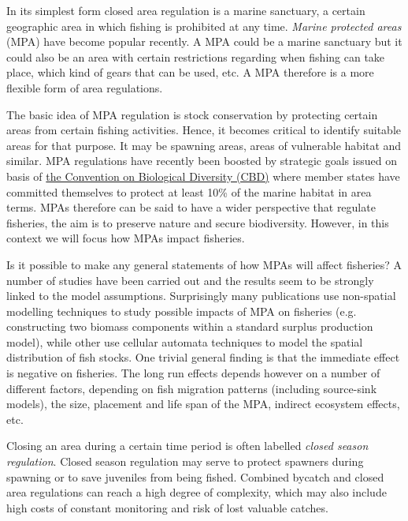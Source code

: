 \documentclass[11pt,fleqn]{book} %
\begin{document}
In its simplest form closed area regulation is a marine sanctuary, a certain geographic area in which fishing is prohibited at any time. \textit{Marine protected areas} (MPA) have become popular recently. A MPA could be a marine sanctuary but it could also be an area with certain restrictions regarding when fishing can take place, which kind of gears that can be used, etc. A MPA therefore is a more flexible form of area regulations.

The basic idea of MPA regulation is stock conservation by protecting certain areas from certain fishing activities. Hence, it becomes critical to identify suitable areas for that purpose. It may be spawning areas, areas of vulnerable habitat and similar. MPA regulations have recently been boosted by strategic goals issued on basis of \href{https://www.cbd.int/}{the Convention on Biological Diversity (CBD)} where member states have committed themselves to protect at least 10\% of the marine habitat in area terms. MPAs therefore can be said to have a wider perspective that regulate fisheries, the aim is to preserve nature and secure biodiversity. However, in this context we will focus how MPAs impact fisheries.

Is it possible to make any general statements of how MPAs will affect fisheries? A number of studies have been carried out and the results seem to be strongly linked to the model assumptions. Surprisingly many publications use non-spatial modelling techniques to study possible impacts of MPA on fisheries (e.g. constructing two biomass components within a standard surplus production model), while other use cellular automata techniques to model the spatial distribution of fish stocks\cite{Silvert2011, Moustakas2011, Seijo2008, Eide2012}. One trivial general finding is that the immediate effect is negative on fisheries. The long run effects depends however on a number of different factors, depending on fish migration patterns (including source-sink models), the size, placement and life span of the MPA, indirect ecosystem effects, etc.

Closing an area during a certain time period is often labelled \textit{closed season regulation}. Closed season regulation may serve to protect spawners during spawning or to save juveniles from being fished. Combined bycatch and closed area regulations can reach a high degree of complexity, which may also include high costs of constant monitoring and risk of lost valuable catches. 
\end{document}
